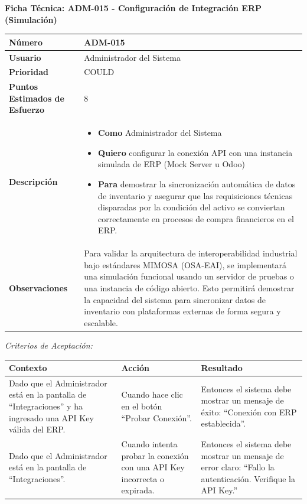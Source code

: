 \vspace{1em}
\noindent\textbf{Ficha Técnica: ADM-015 - Configuración de Integración ERP (Simulación)}
\footnotesize\setlength{\tabcolsep}{4pt}\renewcommand{\arraystretch}{1.2}
\begin{longtable}{|p{0.21\textwidth}|p{0.74\textwidth}|}\hline
\textbf{Número} & ADM-015 \\ \hline
\textbf{Usuario} & Administrador del Sistema \\ \hline
\textbf{Prioridad} & COULD \\ \hline
\textbf{Puntos Estimados de Esfuerzo} & 8 \\ \hline
\textbf{Descripción} & \parbox[t]{\linewidth}{\vspace{2pt}\begin{itemize}[leftmargin=1.5em, nosep, topsep=0pt]
\item \textbf{Como} Administrador del Sistema
\item \textbf{Quiero} configurar la conexión API con una instancia simulada de ERP (Mock Server u Odoo)
\item \textbf{Para} demostrar la sincronización automática de datos de inventario y asegurar que las requisiciones técnicas disparadas por la condición del activo se conviertan correctamente en procesos de compra financieros en el ERP.
\end{itemize}\vspace{2pt}} \\ \hline
\textbf{Observaciones} & Para validar la arquitectura de interoperabilidad industrial bajo estándares MIMOSA (OSA-EAI), se implementará una simulación funcional usando un servidor de pruebas o una instancia de código abierto. Esto permitirá demostrar la capacidad del sistema para sincronizar datos de inventario con plataformas externas de forma segura y escalable. \\ \hline
\end{longtable}\normalsize
\noindent\textit{Criterios de Aceptación:}
\footnotesize\begin{longtable}{|p{0.28\textwidth}|p{0.32\textwidth}|p{0.34\textwidth}|}\hline
\textbf{Contexto} & \textbf{Acción} & \textbf{Resultado} \\ \hline
\parbox[t]{\linewidth}{Dado que el Administrador está en la pantalla de ``Integraciones'' y ha ingresado una API Key válida del ERP.} & \parbox[t]{\linewidth}{Cuando hace clic en el botón ``Probar Conexión''.} & \parbox[t]{\linewidth}{Entonces el sistema debe mostrar un mensaje de éxito: ``Conexión con ERP establecida''.} \\ \hline
\parbox[t]{\linewidth}{Dado que el Administrador está en la pantalla de ``Integraciones''.} & \parbox[t]{\linewidth}{Cuando intenta probar la conexión con una API Key incorrecta o expirada.} & \parbox[t]{\linewidth}{Entonces el sistema debe mostrar un mensaje de error claro: ``Fallo la autenticación. Verifique la API Key.''} \\ \hline
\end{longtable}\normalsize
